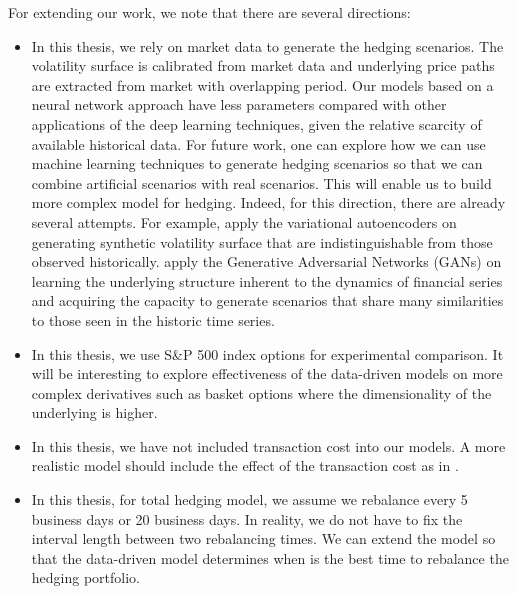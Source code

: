 \documentclass[letterpaper,12pt,titlepage,oneside,final]{book}
\numberwithin{equation}{section}
\theoremstyle{definition}
\begin{document}
For extending our work, we note that there are several directions:
\begin{itemize}
	\item In this thesis, we rely on market data to generate the hedging scenarios.  The volatility surface is calibrated from market data and underlying price paths are extracted from market with overlapping period. Our models based on a neural network approach have less parameters compared with other applications of the deep learning techniques, given the relative scarcity of available historical data. 
	For future work, one can explore how we can use machine learning techniques to generate hedging scenarios so that we can combine artificial scenarios with real scenarios. This will enable us to build more complex model for hedging.
	Indeed, for this direction, there are already several attempts. For example, \citet{bergeron2021variational} apply the variational autoencoders \cite{kingma2013auto} on generating synthetic volatility surface  that are indistinguishable from those observed historically. \citet{pardo2020mitigating} apply the  Generative Adversarial Networks (GANs) \cite{goodfellow2014generative} on learning  the underlying structure inherent to the dynamics of financial series and acquiring the capacity to generate scenarios that share many similarities to those seen in the historic  time series.  
	\item In this thesis, we use S\&P 500 index options for experimental comparison. It will be interesting to explore  effectiveness of the data-driven models on more complex derivatives such as basket options where the dimensionality of the underlying is higher. 
	\item In this thesis, we have not included transaction cost into our models. A more realistic model should include the effect of the transaction cost as in \cite{buehler2019deep}. 
	\item  In this thesis, for total hedging  model, we assume we rebalance every 5 business days or 20 business days. In reality, we do not have to fix the interval length between two rebalancing times. We can extend the model so that the data-driven model determines when is the best time to rebalance the hedging portfolio. 
\end{itemize}



\end{document}
